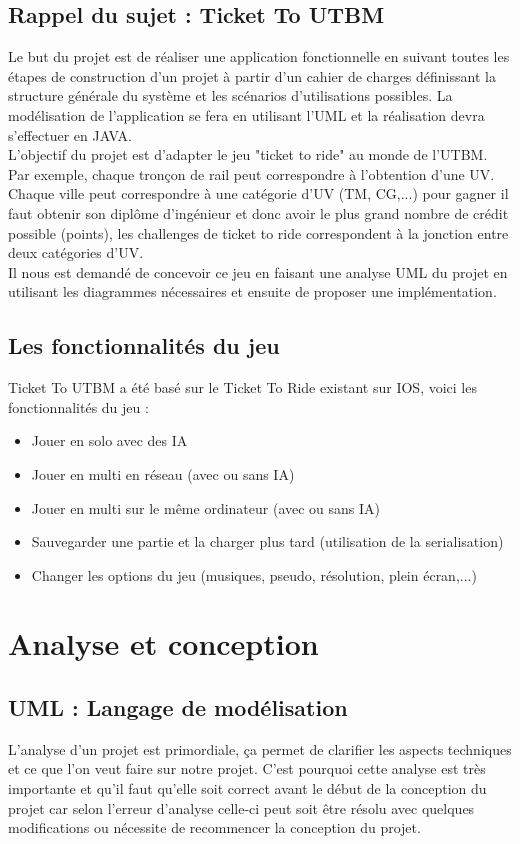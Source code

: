 \documentclass{report}
\begin{document}
\section{Rappel du sujet : Ticket To UTBM}
Le  but  du  projet  est  de  réaliser  une  application fonctionnelle en suivant toutes les étapes de  construction d’un projet à partir d’un cahier de charges définissant  la  structure  générale du  système et les scénarios d’utilisations possibles. La  modélisation  de  l’application se fera en  utilisant l'UML et la réalisation devra s’effectuer en JAVA.\\
L'objectif du projet est d'adapter le jeu "ticket to ride" au monde de l'UTBM. Par exemple, chaque tronçon de rail peut correspondre à l'obtention d'une UV. Chaque ville peut correspondre à une catégorie d'UV (TM, CG,...) pour gagner il faut obtenir son diplôme d'ingénieur et donc avoir le plus grand nombre de crédit possible (points), les challenges de ticket to ride correspondent à la jonction entre deux catégories d'UV.\\
Il nous est demandé de concevoir ce jeu en faisant une analyse  UML  du projet en utilisant les  diagrammes nécessaires et ensuite de proposer une implémentation.

\section{Les fonctionnalités du jeu}
Ticket To UTBM a été basé sur le Ticket To Ride existant sur IOS, voici  les fonctionnalités du jeu :
\begin{itemize}
\item Jouer en solo avec des IA
\item Jouer en multi en réseau (avec ou sans IA)
\item Jouer en multi sur le même ordinateur (avec ou sans IA)
\item Sauvegarder une partie et la charger plus tard (utilisation de la serialisation)
\item Changer les options du jeu (musiques, pseudo, résolution, plein écran,...)
\end{itemize}

\chapter{Analyse et conception}
\section{UML : Langage de modélisation}
L'analyse d'un projet est primordiale, ça permet de clarifier les aspects techniques et ce que l'on veut faire sur notre projet. C'est pourquoi cette analyse est très importante et qu'il faut qu'elle soit correct avant le début de la conception du projet car selon l'erreur d'analyse celle-ci peut soit être résolu avec quelques modifications ou nécessite de recommencer la conception du projet.\\
\end{document}
